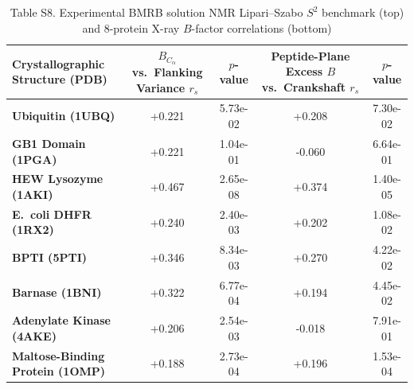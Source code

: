 \documentclass[10pt,letterpaper]{article}
\begin{document}
\begin{table}[!htbp]
\centering
\caption*{Table S8. Experimental BMRB solution NMR Lipari--Szabo $S^2$ benchmark (top) and 8-protein X-ray $B$-factor correlations (bottom)}

\vspace{5pt}
\footnotesize
\setlength{\tabcolsep}{6.0pt}
\begin{tabular}{@{}l c c c c@{}}
\toprule[1.1pt]
\textbf{Crystallographic Structure (PDB)} & \textbf{$B_{C_\alpha}$ vs.\ Flanking Variance $r_s$} & \textbf{$p$-value} & \textbf{Peptide-Plane Excess $B$ vs.\ Crankshaft $r_s$} & \textbf{$p$-value} \\
\midrule[0.6pt]
\textbf{Ubiquitin (1UBQ)} & +0.221 & 5.73e-02 & +0.208 & 7.30e-02 \\
\textbf{GB1 Domain (1PGA)} & +0.221 & 1.04e-01 & -0.060 & 6.64e-01 \\
\textbf{HEW Lysozyme (1AKI)} & +0.467 & 2.65e-08 & +0.374 & 1.40e-05 \\
\textbf{E.\ coli DHFR (1RX2)} & +0.240 & 2.40e-03 & +0.202 & 1.08e-02 \\
\textbf{BPTI (5PTI)} & +0.346 & 8.34e-03 & +0.270 & 4.22e-02 \\
\textbf{Barnase (1BNI)} & +0.322 & 6.77e-04 & +0.194 & 4.45e-02 \\
\textbf{Adenylate Kinase (4AKE)} & +0.206 & 2.54e-03 & -0.018 & 7.91e-01 \\
\textbf{Maltose-Binding Protein (1OMP)} & +0.188 & 2.73e-04 & +0.196 & 1.53e-04 \\
\bottomrule[1.1pt]
\end{tabular}
\end{table}
\end{document}
